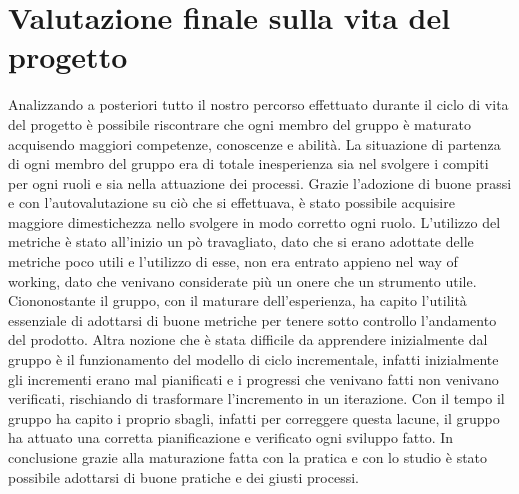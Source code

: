 \section{Valutazione finale sulla vita del progetto}
Analizzando a posteriori tutto il nostro percorso effettuato durante il ciclo di vita del progetto è possibile riscontrare che ogni membro del gruppo \Gruppo{} è maturato acquisendo maggiori competenze, conoscenze e abilità. La situazione di partenza di ogni membro del gruppo era di totale inesperienza sia nel svolgere i compiti per ogni ruoli e sia nella attuazione dei processi. Grazie l'adozione di buone prassi e con l'autovalutazione su ciò che si effettuava, è stato possibile acquisire maggiore dimestichezza nello svolgere in modo corretto ogni ruolo. L'utilizzo del metriche è stato all'inizio un pò travagliato, dato che si erano adottate delle metriche poco utili e l'utilizzo di esse, non era entrato appieno nel \textsf{way of working}, dato che venivano considerate più un onere che un strumento utile. Ciononostante il gruppo, con il maturare dell'esperienza, ha capito l'utilità essenziale di adottarsi di buone metriche per tenere sotto controllo l'andamento del prodotto. Altra nozione che è stata difficile da apprendere inizialmente dal gruppo è il funzionamento del modello di ciclo incrementale, infatti inizialmente gli incrementi erano mal pianificati e i progressi che venivano fatti non venivano verificati, rischiando di trasformare l'incremento in un iterazione. Con il tempo il gruppo ha capito i proprio sbagli, infatti per correggere questa lacune, il gruppo ha attuato una corretta pianificazione e verificato ogni sviluppo fatto. In conclusione grazie alla maturazione fatta con la pratica e con lo studio è stato possibile adottarsi di buone pratiche e dei giusti processi.